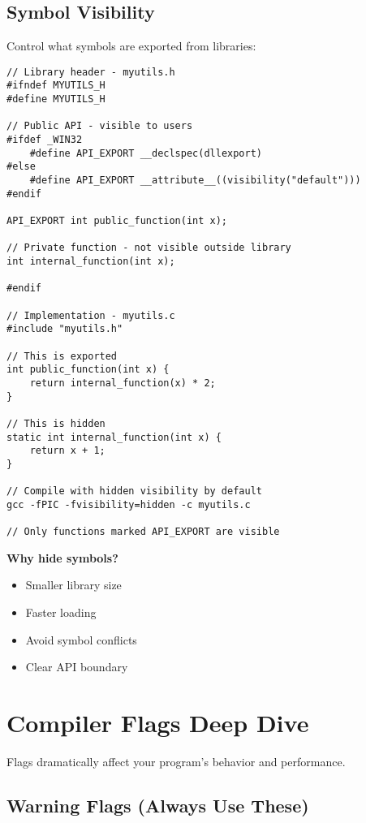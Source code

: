 \subsection{Symbol Visibility}

Control what symbols are exported from libraries:

\begin{lstlisting}
// Library header - myutils.h
#ifndef MYUTILS_H
#define MYUTILS_H

// Public API - visible to users
#ifdef _WIN32
    #define API_EXPORT __declspec(dllexport)
#else
    #define API_EXPORT __attribute__((visibility("default")))
#endif

API_EXPORT int public_function(int x);

// Private function - not visible outside library
int internal_function(int x);

#endif

// Implementation - myutils.c
#include "myutils.h"

// This is exported
int public_function(int x) {
    return internal_function(x) * 2;
}

// This is hidden
static int internal_function(int x) {
    return x + 1;
}

// Compile with hidden visibility by default
gcc -fPIC -fvisibility=hidden -c myutils.c

// Only functions marked API_EXPORT are visible
\end{lstlisting}

\textbf{Why hide symbols?}

\begin{itemize}
    \item Smaller library size
    \item Faster loading
    \item Avoid symbol conflicts
    \item Clear API boundary
\end{itemize}

\section{Compiler Flags Deep Dive}

Flags dramatically affect your program's behavior and performance.

\subsection{Warning Flags (Always Use These)}

